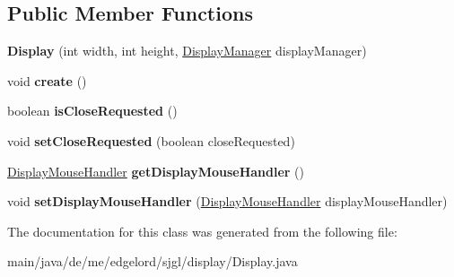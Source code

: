 \subsection*{Public Member Functions}
\begin{DoxyCompactItemize}
\item 
\mbox{\label{classde_1_1me_1_1edgelord_1_1sjgl_1_1display_1_1_display_a08dad724ea06d69090e5bbaeb61b5f28}} 
{\bfseries Display} (int width, int height, \mbox{\hyperlink{classde_1_1me_1_1edgelord_1_1sjgl_1_1display_1_1_display_manager}{Display\+Manager}} display\+Manager)
\item 
\mbox{\label{classde_1_1me_1_1edgelord_1_1sjgl_1_1display_1_1_display_ae61e504c8311829fcf46b652f55eaa97}} 
void {\bfseries create} ()
\item 
\mbox{\label{classde_1_1me_1_1edgelord_1_1sjgl_1_1display_1_1_display_a331d4c282dd71d69705e78a42050df4f}} 
boolean {\bfseries is\+Close\+Requested} ()
\item 
\mbox{\label{classde_1_1me_1_1edgelord_1_1sjgl_1_1display_1_1_display_a388c4ea4967206d5ed012c55df2a8f8c}} 
void {\bfseries set\+Close\+Requested} (boolean close\+Requested)
\item 
\mbox{\label{classde_1_1me_1_1edgelord_1_1sjgl_1_1display_1_1_display_a820c29e4b2035160f2ea191d0fc4e5e3}} 
\mbox{\hyperlink{interfacede_1_1me_1_1edgelord_1_1sjgl_1_1input_1_1_display_mouse_handler}{Display\+Mouse\+Handler}} {\bfseries get\+Display\+Mouse\+Handler} ()
\item 
\mbox{\label{classde_1_1me_1_1edgelord_1_1sjgl_1_1display_1_1_display_a4036d31fd9d8fb824ec69fc5fed24d74}} 
void {\bfseries set\+Display\+Mouse\+Handler} (\mbox{\hyperlink{interfacede_1_1me_1_1edgelord_1_1sjgl_1_1input_1_1_display_mouse_handler}{Display\+Mouse\+Handler}} display\+Mouse\+Handler)
\end{DoxyCompactItemize}


The documentation for this class was generated from the following file\+:\begin{DoxyCompactItemize}
\item 
main/java/de/me/edgelord/sjgl/display/Display.\+java\end{DoxyCompactItemize}
